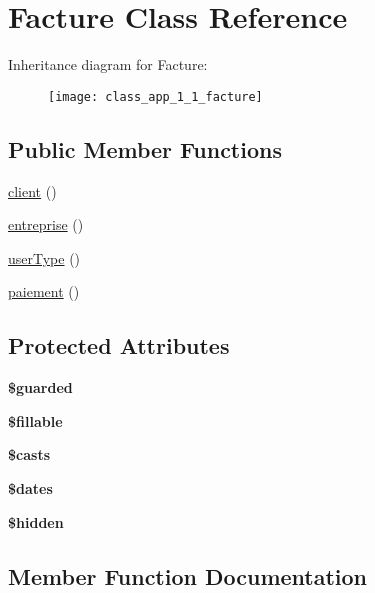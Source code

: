 \hypertarget{class_app_1_1_facture}{}\section{Facture Class Reference}
\label{class_app_1_1_facture}
Inheritance diagram for Facture\+:\begin{figure}[H]
\begin{center}
\leavevmode
\texttt{[image: class\_app\_1\_1\_facture]}
\end{center}
\end{figure}
\subsection*{Public Member Functions}
\begin{DoxyCompactItemize}
\item 
\mbox{\hyperlink{class_app_1_1_facture_a72bb4baf8e7ea0237eecfb31d69310b2}{client}} ()
\item 
\mbox{\hyperlink{class_app_1_1_facture_ad51130e7e8195d53e3670bb41642cb14}{entreprise}} ()
\item 
\mbox{\hyperlink{class_app_1_1_facture_a7d57b7b59a41f1e62a9162798054aee1}{user\+Type}} ()
\item 
\mbox{\hyperlink{class_app_1_1_facture_a66d456cbae7f1c1bb77dd821d23f02b8}{paiement}} ()
\end{DoxyCompactItemize}
\subsection*{Protected Attributes}
\begin{DoxyCompactItemize}
\item 
{\bfseries \$guarded}
\item 
{\bfseries \$fillable}
\item 
{\bfseries \$casts}
\item 
{\bfseries \$dates}
\item 
{\bfseries \$hidden}
\end{DoxyCompactItemize}


\subsection{Member Function Documentation}
\mbox{\label{class_app_1_1_facture_a72bb4baf8e7ea0237eecfb31d69310b2}} 
